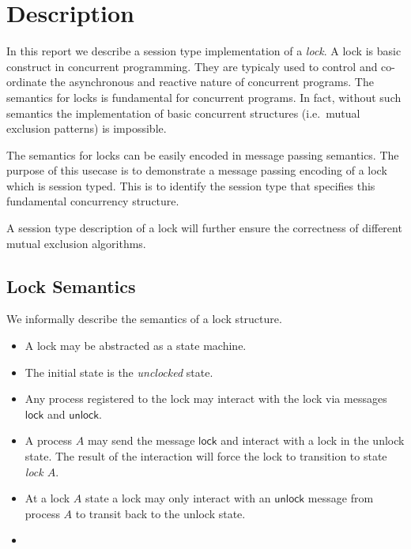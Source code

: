 \section{Description}

In this report we describe a session type implementation
of a {\em lock}. A lock is basic construct in concurrent
programming.
They are typicaly used 
to control and co-ordinate the asynchronous and reactive
nature of concurrent programs.
The semantics for locks is fundamental for concurrent
programs. In fact, without such semantics the implementation
of basic concurrent structures (i.e.~mutual exclusion patterns)
is impossible.

The semantics for locks can be easily encoded in
message passing semantics. The purpose of this
usecase is to demonstrate a message passing encoding
of a lock which is session typed. This is to
identify the session type that specifies this
fundamental concurrency structure.

A session type description of a lock will further
ensure the correctness of different mutual exclusion algorithms.

\newcommand{\lock}{\ensuremath{\mathsf{lock}}\xspace}
\newcommand{\unlock}{\ensuremath{\mathsf{unlock}}\xspace}

\subsection{Lock Semantics}

We informally describe the semantics of a lock structure.

\begin{itemize}
	\item	A lock may be abstracted as a state machine.

	\item	The initial state is the {\em unclocked} state.

	\item	Any process registered to the lock may interact with the
			lock via messages \lock and \unlock.

	\item	A process $A$ may send the message \lock and interact with a lock in the unlock state.
			The result of the interaction will force the lock to transition to state {\em lock $A$}.

	\item	At a lock $A$ state a lock may only interact with an \unlock message from process $A$
			to transit back to the unlock state.

	\item	
\end{itemize}


